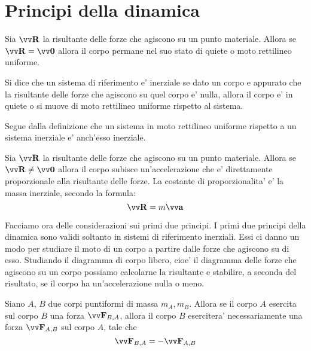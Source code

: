 \section{Principi della dinamica}

\begin{principle}
    Sia $\bvv{R}$ la risultante delle forze che agiscono su un punto materiale. Allora se $\bvv{R} = \bvv{0}$ allora il corpo permane nel suo stato di quiete o moto rettilineo uniforme.
\end{principle}

\begin{definition}
    Si dice che un sistema di riferimento e' inerziale se dato un corpo e appurato che la risultante delle forze che agiscono su quel corpo e' nulla, allora il corpo e' in quiete o si muove di moto rettilineo uniforme rispetto al sistema.
\end{definition}

Segue dalla definizione che un sistema in moto rettilineo uniforme rispetto a un sistema inerziale e' anch'esso inerziale.

\begin{principle}
    Sia $\bvv{R}$ la risultante delle forze che agiscono su un punto materiale. Allora se $\bvv{R} \neq \bvv{0}$ allora il corpo subisce un'accelerazione che e' direttamente proporzionale alla risultante delle forze. La costante di proporzionalita' e' la massa inerziale, secondo la formula:
    \begin{equation} \label{second_principle}
        \bvv{R} = m\bvv{a}
    \end{equation}
\end{principle}

Facciamo ora delle considerazioni sui primi due principi.
I primi due principi della dinamica sono validi soltanto in sistemi di riferimento inerziali. Essi ci danno un modo per studiare il moto di un corpo a partire dalle forze che agiscono su di esso. Studiando il diagramma di corpo libero, cioe' il diagramma delle forze che agiscono su un corpo possiamo calcolarne la risultante e stabilire, a seconda del risultato, se il corpo ha un'accelerazione nulla o meno.

\begin{principle}
    Siano $A$, $B$ due corpi puntiformi di massa $m_A, m_B$. Allora se il corpo $A$ esercita sul corpo $B$ una forza $\bvv{F}_{B,A}$, allora il corpo $B$ esercitera' necessariamente una forza $\bvv{F}_{A, B}$ sul corpo $A$, tale che
    \begin{equation} \label{third_principle}
        \bvv{F}_{B, A} = -\bvv{F}_{A, B}   
    \end{equation}
\end{principle}

